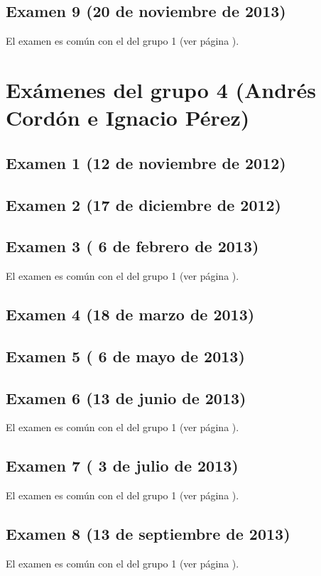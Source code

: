 \documentclass[a4paper,12pt,twoside]{book}
\begin{document}
\subsection{Examen 9 (20 de noviembre de 2013)}
El examen es común con el del grupo 1 (ver página \pageref{examen_12_13_2_9}).

\section{Exámenes del grupo 4 (Andrés Cordón e Ignacio Pérez)}
\subsection{Examen 1 (12 de noviembre de 2012)}
\subsection{Examen 2 (17 de diciembre de 2012)}
\subsection{Examen 3 ( 6 de febrero de 2013)}
El examen es común con el del grupo 1 (ver página \pageref{examen_12_13_2_3}).
\subsection{Examen 4 (18 de marzo de 2013)}
\subsection{Examen 5 ( 6 de mayo de 2013)}
\subsection{Examen 6 (13 de junio de 2013)}
El examen es común con el del grupo 1 (ver página \pageref{examen_12_13_1_6}).
\subsection{Examen 7 ( 3 de julio de 2013)}
El examen es común con el del grupo 1 (ver página \pageref{examen_12_13_2_7}).
\subsection{Examen 8 (13 de septiembre de 2013)}
El examen es común con el del grupo 1 (ver página \pageref{examen_12_13_2_8}).
\end{document}
